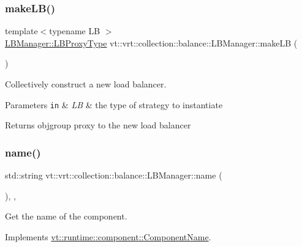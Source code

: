 \subsubsection{\texorpdfstring{make\+L\+B()}{makeLB()}}
{\footnotesize\ttfamily template$<$typename LB $>$ \\
\hyperlink{structvt_1_1vrt_1_1collection_1_1balance_1_1_l_b_manager_a8b1a7735366beb85c2c2ccc3912cdd80}{L\+B\+Manager\+::\+L\+B\+Proxy\+Type} vt\+::vrt\+::collection\+::balance\+::\+L\+B\+Manager\+::make\+LB (\begin{DoxyParamCaption}{ }\end{DoxyParamCaption})\hspace{0.3cm}{\ttfamily [protected]}}



Collectively construct a new load balancer. 


\begin{DoxyParams}[1]{Parameters}
\mbox{\tt in}  & {\em LB} & the type of strategy to instantiate\\
\hline
\end{DoxyParams}
\begin{DoxyReturn}{Returns}
objgroup proxy to the new load balancer 
\end{DoxyReturn}
\mbox{\label{structvt_1_1vrt_1_1collection_1_1balance_1_1_l_b_manager_a8e18e972cf9e8658da9577d45e090698}} 
\subsubsection{\texorpdfstring{name()}{name()}}
{\footnotesize\ttfamily std\+::string vt\+::vrt\+::collection\+::balance\+::\+L\+B\+Manager\+::name (\begin{DoxyParamCaption}{ }\end{DoxyParamCaption})\hspace{0.3cm}{\ttfamily [inline]}, {\ttfamily [override]}, {\ttfamily [virtual]}}



Get the name of the component. 



Implements \hyperlink{structvt_1_1runtime_1_1component_1_1_component_name_a33c06229bb605a2b2ceff68830d6d773}{vt\+::runtime\+::component\+::\+Component\+Name}.

